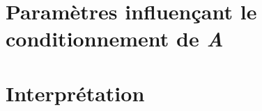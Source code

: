 \documentclass{article}
\begin{document}
\section{Paramètres influençant le conditionnement de \textit{A}}

\section{Interprétation}
\end{document}
